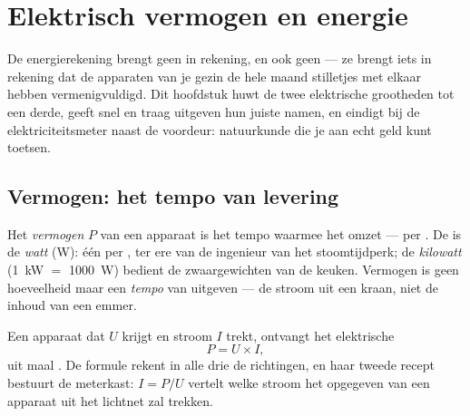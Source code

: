 \chapter{Elektrisch vermogen en energie}\label{ch:g9:electric-power-energy}

De energierekening brengt geen  in rekening, en ook geen
 --- ze brengt iets in rekening dat de apparaten van je
gezin de hele maand stilletjes met elkaar hebben vermenigvuldigd. Dit
hoofdstuk huwt de twee elektrische grootheden tot een derde, geeft snel
en traag uitgeven hun juiste namen, en eindigt bij de elektriciteitsmeter naast de
voordeur: natuurkunde die je aan echt geld kunt toetsen.

\section{Vermogen: het tempo van levering}

\begin{definition}\label{def:g9:electric-power-energy:power}
Het \emph{vermogen} $P$ van een apparaat is het tempo
waarmee het  omzet ---  per . De
 is de \emph{watt} (\unit{W}): één
 per , ter ere van de ingenieur van het
stoomtijdperk; de \emph{kilowatt} (\qty{1}{kW} $=$ \qty{1000}{W})
bedient de zwaargewichten van de keuken. Vermogen is geen hoeveelheid
 maar een \emph{tempo} van uitgeven --- de stroom uit een
kraan, niet de inhoud van een emmer.
\end{definition}

\begin{proposition}\label{prop:g9:electric-power-energy:UI}
Een apparaat dat  $U$ krijgt en stroom $I$ trekt,
ontvangt het elektrische 
\[
P = U \times I ,
\]
 uit  maal . De formule
rekent in alle drie de richtingen, en haar tweede recept bestuurt de
meterkast: $I = P/U$ vertelt welke stroom het opgegeven
 van een apparaat uit het lichtnet zal trekken.
\end{proposition}

